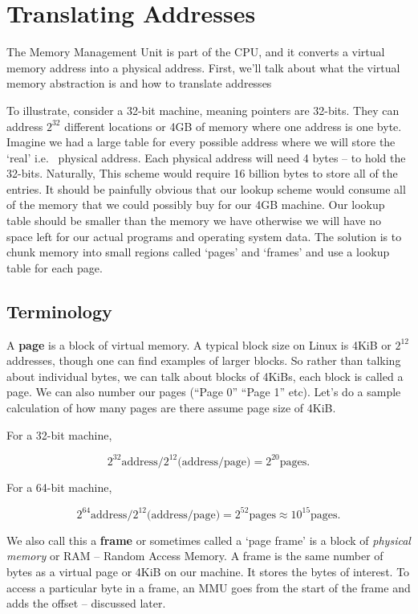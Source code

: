 \section{Translating Addresses}

The Memory Management Unit is part of the CPU, and it converts a virtual memory address into a physical address.
First, we'll talk about what the virtual memory abstraction is and how to translate addresses

To illustrate, consider a 32-bit machine, meaning pointers are 32-bits.
They can address $2^{32}$ different locations or 4GB of memory where one address is one byte.
Imagine we had a large table for every possible address where we will store the `real' i.e. ~physical address.
Each physical address will need 4 bytes -- to hold the 32-bits.
Naturally, This scheme would require 16 billion bytes to store all of the entries.
It should be painfully obvious that our lookup scheme would consume all of the memory that we could possibly buy for our 4GB machine.
Our lookup table should be smaller than the memory we have otherwise we will have no space left for our actual programs and operating system data.
The solution is to chunk memory into small regions called `pages' and `frames' and use a lookup table for each page.

\subsection{Terminology}

A \textbf{page} is a block of virtual memory.
A typical block size on Linux is 4KiB or $2^{12}$ addresses, though one can find examples of larger blocks.
So rather than talking about individual bytes, we can talk about blocks of 4KiBs, each block is called a page.
We can also number our pages (``Page 0'' ``Page 1'' etc). Let's do a sample calculation of how many pages are there assume page size of 4KiB.

For a 32-bit machine,

\[
   2^{32} \text{address} / 2^{12} \text{(address/page)} = 2^{20} \text{pages}.
\]

For a 64-bit machine,

\[
   2^{64} \text{address} / 2^{12} \text{(address/page)} = 2^{52} \text{pages} \approx 10^{15} \text{pages}.
\]

We also call this a \textbf{frame} or sometimes called a `page frame' is a block of \emph{physical memory} or RAM -- Random Access Memory.
A frame is the same number of bytes as a virtual page or 4KiB on our machine.
It stores the bytes of interest.
To access a particular byte in a frame, an MMU goes from the start of the frame and adds the offset -- discussed later.

